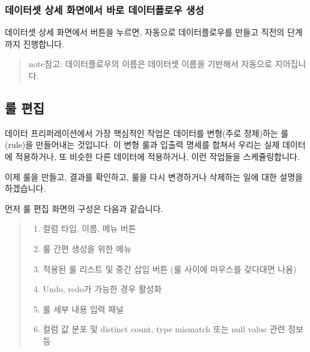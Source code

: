 \documentclass[letterpaper,10pt,english]{sphinxmanual}
\begin{document}
\subsubsection{데이터셋 상세 화면에서 바로 데이터플로우 생성}
\label{\detokenize{discovery/part07/add_datasets:dataflow-from-dataset}}\label{\detokenize{discovery/part07/add_datasets:id3}}
데이터셋 상세 화면에서  버튼을 누르면, 자동으로 데이터플로우를 만들고  직전의 단계까지 진행합니다.
\begin{quote}

\begin{figure}[H]
\centering

\noindent{}
\end{figure}

\begin{sphinxadmonition}{note}{참고:}
데이터플로우의 이름은 데이터셋 이름을 기반해서 자동으로 지어집니다.
\end{sphinxadmonition}
\end{quote}


\subsection{룰 편집}
\label{\detokenize{discovery/part07/edit_rules:id1}}\label{\detokenize{discovery/part07/edit_rules::doc}}
데이터 프리퍼레이션에서 가장 핵심적인 작업은 데이터를 변형(주로 정제)하는 룰(rule)을 만들어내는 것입니다.
이 변형 룰과 입출력 명세를 합쳐서 우리는 실제 데이터에 적용하거나, 또 비슷한 다른 데이터에 적용하거나, 이런 작업들을 스케쥴링합니다.

이제 룰을 만들고, 결과를 확인하고, 룰을 다시 변경하거나 삭제하는 일에 대한 설명을 하겠습니다.

먼저 룰 편집 화면의 구성은 다음과 같습니다.
\begin{quote}

\begin{figure}[H]
\centering

\noindent{}
\end{figure}
\begin{enumerate}
\def\theenumi{\arabic{enumi}}
\def\labelenumi{\theenumi .}
\makeatletter\def\p@enumii{\p@enumi \theenumi .}\makeatother
\item {} 
컬럼 타입, 이름, 메뉴 버튼

\item {} 
룰 간편 생성을 위한 메뉴

\item {} 
적용된 룰 리스트 및 중간 삽입 버튼 (룰 사이에 마우스를 갖다대면 나옴)

\item {} 
Undo, redo가 가능한 경우 활성화

\item {} 
룰 세부 내용 입력 패널

\item {} 
컬럼 값 분포 및 distinct count, type mismatch 또는 null value 관련 정보 등

\end{enumerate}
\end{quote}
\end{document}
